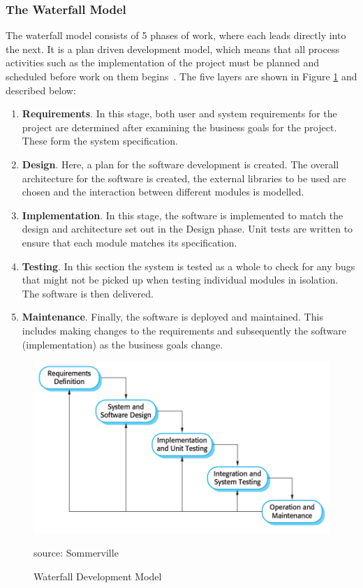 \documentclass{article}
\begin{document}
\subsubsection{The Waterfall Model}
The waterfall model consists of 5 phases of work, where each leads directly into the next.  It is a plan driven development model, which means that all process activities such as the implementation of the project must be planned and scheduled before work on them begins~\cite{sommervilleSoftwareEngineering}.  The five layers are shown in Figure \ref{fig:waterfallModel} and described below:
\begin{enumerate}
  \item {\bf Requirements}.  In this stage, both user and system requirements for the project are determined after examining the business goals for the project.  These form the system specification.
  \item {\bf Design}.  Here, a plan for the software development is created.  The overall architecture for the software is created, the external libraries to be used are chosen and the interaction between different modules is modelled.
  \item {\bf Implementation}.  In this stage, the software is implemented to match the design and architecture set out in the Design phase.  Unit tests are written to ensure that each module matches its specification.
  \item {\bf Testing}.  In this section the system is tested as a whole to check for any bugs that might not be picked up when testing individual modules in isolation.  The software is then delivered.
  \item {\bf Maintenance}.  Finally, the software is deployed and maintained.  This includes making changes to the requirements and subsequently the software (implementation) as the business goals change. ~\cite{sommervilleSoftwareEngineering}
\end{enumerate}

\begin{figure}[htb] 
\centering
    \includegraphics[width=0.8\linewidth]{waterfallModel}
\caption{Waterfall Development Model}
\small source: Sommerville~\cite{sommervilleSoftwareEngineering}
\label{fig:waterfallModel}
\end{figure}
\end{document}
